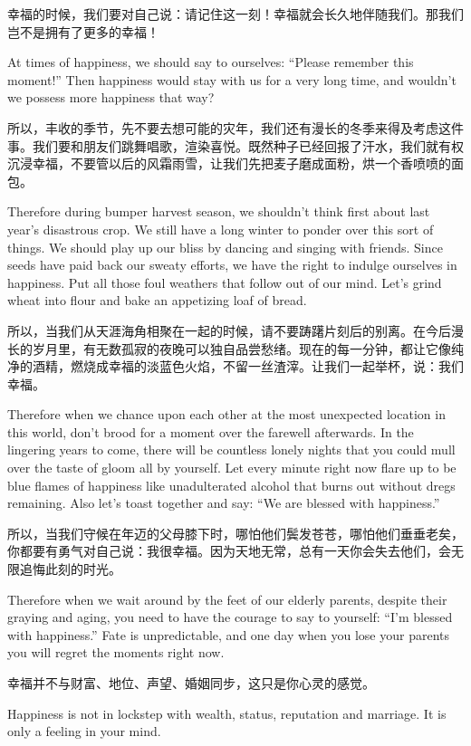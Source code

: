 {幸福的时候，我们要对自己说：请记住这一刻！幸福就会长久地伴随我们。那我们岂不是拥有了更多的幸福！

At times of happiness, we should say to ourselves: “Please remember this moment!” Then happiness would stay with us for a very long time, and wouldn't we possess more happiness that way?

所以，丰收的季节，先不要去想可能的灾年，我们还有漫长的冬季来得及考虑这件事。我们要和朋友们跳舞唱歌，渲染喜悦。既然种子已经回报了汗水，我们就有权沉浸幸福，不要管以后的风霜雨雪，让我们先把麦子磨成面粉，烘一个香喷喷的面包。

Therefore during bumper harvest season, we shouldn't think first about last year's disastrous crop. We still have a long winter to ponder over this sort of things. We should play up our bliss by dancing and singing with friends. Since seeds have paid back our sweaty efforts, we have the right to indulge ourselves in happiness. Put all those foul weathers that follow out of our mind. Let's grind wheat into flour and bake an appetizing loaf of bread.

所以，当我们从天涯海角相聚在一起的时候，请不要踌躇片刻后的别离。在今后漫长的岁月里，有无数孤寂的夜晚可以独自品尝愁绪。现在的每一分钟，都让它像纯净的酒精，燃烧成幸福的淡蓝色火焰，不留一丝渣滓。让我们一起举杯，说：我们幸福。

Therefore when we chance upon each other at the most unexpected location in this world, don't brood for a moment over the farewell afterwards. In the lingering years to come, there will be countless lonely nights that you could mull over the taste of gloom all by yourself. Let every minute right now flare up to be blue flames of happiness like unadulterated alcohol that burns out without dregs remaining. Also let's toast together and say: “We are blessed with happiness.”

所以，当我们守候在年迈的父母膝下时，哪怕他们鬓发苍苍，哪怕他们垂垂老矣，你都要有勇气对自己说：我很幸福。因为天地无常，总有一天你会失去他们，会无限追悔此刻的时光。

Therefore when we wait around by the feet of our elderly parents, despite their graying and aging, you need to have the courage to say to yourself: “I'm blessed with happiness.” Fate is unpredictable, and one day when you lose your parents you will regret the moments right now.

幸福并不与财富、地位、声望、婚姻同步，这只是你心灵的感觉。

Happiness is not in lockstep with wealth, status, reputation and marriage. It is only a feeling in your mind.

}
